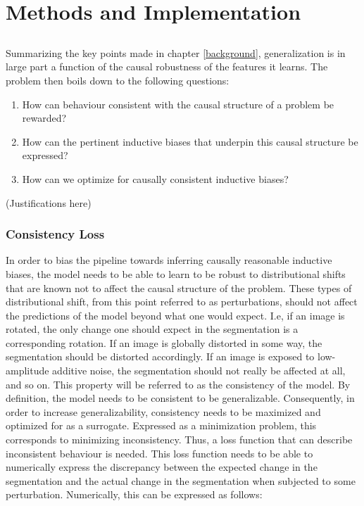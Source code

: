 \chapter{Methods and Implementation}
\setcounter{chapter}{3}
\section{\alg}

Summarizing the key points made in chapter \ref{background}, generalization is in large part a function of the causal robustness of the features it learns. The problem then boils down to the following questions:
\begin{enumerate}
    \item How can behaviour consistent with the causal structure of a problem be rewarded? \label{loss}
    \item How can the pertinent inductive biases that underpin this causal structure be expressed? \label{mnv}
    \item How can we optimize for causally consistent inductive biases?\label{training}
\end{enumerate}

(Justifications here)
	\subsection{Consistency Loss}
    In order to bias the pipeline towards inferring causally reasonable inductive biases, the model needs to be able to learn to be robust to distributional shifts that are known not to affect the causal structure of the problem. These types of distributional shift, from this point referred to as perturbations, should not affect the predictions of the model beyond what one would expect. I.e, if an image is rotated, the only change one should expect in the segmentation is a corresponding rotation. If an image is globally distorted in some way, the segmentation should be distorted accordingly. If an image is exposed to low-amplitude additive noise, the segmentation should not really be affected at all, and so on. This property will be referred to as the consistency of the model. By definition, the model needs to be consistent to be generalizable. Consequently, in order to increase generalizability, consistency needs to be maximized and optimized for as a surrogate. Expressed as a minimization problem, this corresponds to minimizing inconsistency. Thus, a loss function that can describe inconsistent behaviour is needed. This loss function needs to be able to numerically express the discrepancy between the expected change in the segmentation and the actual change in the segmentation when subjected to some perturbation. Numerically, this can be expressed as follows:

